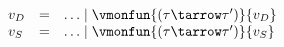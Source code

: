 {\flushleft

$\begin{array}{l c l}
  v_D & = & \ldots \mid \vmonfun{(\tau\tarrow\tau')}{v_D}
\\
  v_S & = & \ldots \mid \vmonfun{(\tau\tarrow\tau')}{v_S}
\end{array}$

\smallskip
\begin{mathpar}

\end{mathpar}

\smallskip
\begin{mathpar}

\end{mathpar}
}
